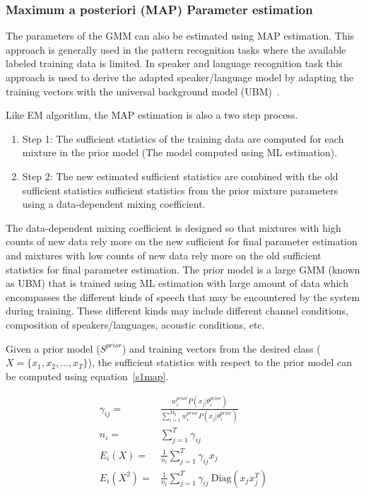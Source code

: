 \begin{spacing}{1.5}
\subsubsection{Maximum a posteriori (MAP) Parameter estimation}
\label{secmap}
The parameters of the GMM can also be estimated using MAP estimation. This approach is generally used in the pattern recognition tasks where the available labeled training data is limited. In speaker and language recognition task this approach is used to derive the adapted speaker/language model by adapting the training vectors with the universal background model (UBM)~\cite{reynolds2000speaker}. 

Like EM algorithm, the MAP estimation is also a two step process.
\begin{enumerate}
    \item Step 1: The sufficient statistics of the training data are computed for each mixture in the prior model (The model computed using ML estimation).
    \item Step 2: The new estimated sufficient statistics are combined with the old sufficient statistics sufficient statistics from the prior mixture parameters using a data-dependent mixing coefficient. 
\end{enumerate}
The data-dependent mixing coefficient is designed so that mixtures with high counts of new data rely more on the new sufficient for final parameter estimation and mixtures with low counts of new data rely more on the old sufficient statistics for final parameter estimation. The prior model is a large GMM (known as UBM) that is trained using ML estimation with large amount of data which encompasses the different kinds of speech that may be encountered by the system during training. These different kinds may include different channel conditions, composition of speakers/languages, acoustic conditions, etc.

Given a prior model ($S^{prior}$) and training vectors from the desired class ($X=\{x_{1},x_{2},\ldots,x_{T}\}$), the sufficient statistics with respect to the prior model can be computed using equation~\ref{s1map}.

\begin{equation}
\label{s1map}
    \begin{aligned}
     \gamma_{ij}=&\frac{w_{i}^{prior}P(x_{j}|\theta_{i}^{prior})}{\sum_{i=1}^{M_{g}}w_{i}^{prior}P(x_{j}|\theta_{i}^{prior})}\\
     n_{i}=&\sum_{j=1}^{T}\gamma_{ij}\\
     E_{i}(X)=&\frac{1}{n_{i}}\sum_{j=1}^{T}\gamma_{ij}x_{j}\\
     E_{i}(X^{2})=&\frac{1}{n_{i}}\sum_{j=1}^{T}\gamma_{ij}~\mbox{Diag}(x_{j}x_{j}^{T})
    \end{aligned}
\end{equation}


\end{spacing}
